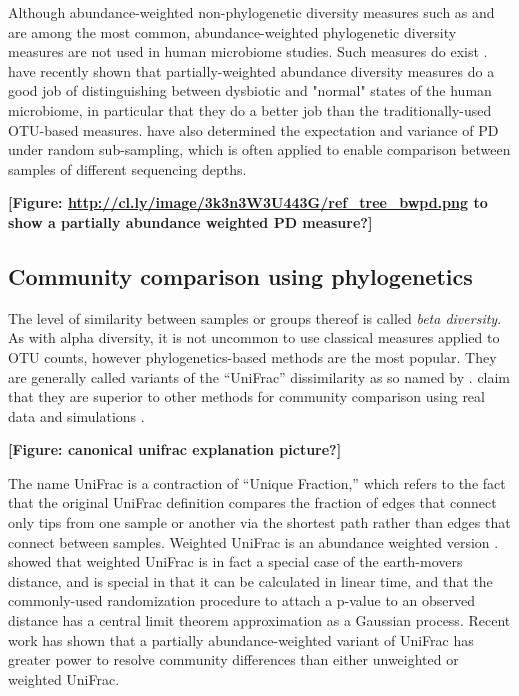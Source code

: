 \documentclass{amsart}
\begin{document}
Although abundance-weighted non-phylogenetic diversity measures such as \citet{simpson1949measurement} and \citet{shannon1948mathematical} are among the most common, abundance-weighted phylogenetic diversity measures are not used in human microbiome studies.
Such measures do exist \citep{rao1982diversity,barker2002phylogenetic,allen2009new,chao2010phylogenetic,vellend2011measuring}.
\citet{mccoy2013abundance} have recently shown that partially-weighted abundance diversity measures do a good job of distinguishing between dysbiotic and "normal" states of the human microbiome, in particular that they do a better job than the traditionally-used OTU-based measures.
\citet{nipperess2013mean} have also determined the expectation and variance of PD under random sub-sampling, which is often applied to enable comparison between samples of different sequencing depths.

\textbf{[Figure: \url{http://cl.ly/image/3k3n3W3U443G/ref_tree_bwpd.png} to show a partially abundance weighted PD measure?]}

\subsection{Community comparison using phylogenetics}
The level of similarity between samples or groups thereof is called \emph{beta diversity}.
As with alpha diversity, it is not uncommon to use classical measures \citep[e.g.][]{jaccard1908nouvelles} applied to OTU counts, however phylogenetics-based methods are the most popular.
They are generally called variants of the ``UniFrac'' dissimilarity as so named by \citet{LozuponeKnightUniFrac05}.
\citet{kuczynski2010microbial} claim that they are superior to other methods for community comparison using real data and simulations \citep[for a contrary viewpoint using simulations see][]{schloss2008evaluating}.

\textbf{[Figure: canonical unifrac explanation picture?]}

The name UniFrac is a contraction of ``Unique Fraction,'' which refers to the fact that the original UniFrac definition compares the fraction of edges that connect only tips from one sample or another via the shortest path rather than edges that connect between samples.
Weighted UniFrac is an abundance weighted version \citep{LozuponeEaWeightedUnifrac07}.
\citet{evans2012phylogenetic} showed that weighted UniFrac is in fact a special case of the earth-movers distance, and is special in that it can be calculated in linear time, and that the commonly-used randomization procedure to attach a p-value to an observed distance has a central limit theorem approximation as a Gaussian process.
Recent work \citep{chen2012associating} has shown that a partially abundance-weighted variant of UniFrac has greater power to resolve community differences than either unweighted or weighted UniFrac.
\end{document}
